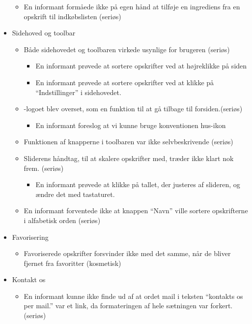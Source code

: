\begin{itemize}[noitemsep]
\begin{itemize}[noitemsep]
  \item En informant formåede ikke på egen hånd at tilføje en ingrediens fra en opskrift til indkøbslisten (seriøs)
  \end{itemize}
 \item Sidehoved og toolbar
  \begin{itemize}[noitemsep]
  \item Både sidehovedet og toolbaren virkede usynlige for brugeren (seriøs)
   \begin{itemize}[noitemsep]
   \item En informant prøvede at sortere opskrifter ved at højreklikke på siden
   \item En informant prøvede at sortere opskrifter ved at klikke på ``Indstillinger'' i sidehovedet.
   \end{itemize}
  \item \Foodl-logoet blev overset, som en funktion til at gå tilbage til forsiden.(seriøs)
   \begin{itemize}[noitemsep]
   \item En informant foreslog at vi kunne bruge konventionen hus-ikon
   \end{itemize}
  \item Funktionen af knapperne i toolbaren var ikke selvbeskrivende (seriøs)
  \item Sliderens håndtag, til at skalere opskrifter med, træder ikke klart nok frem. (seriøs)
   \begin{itemize}[noitemsep]
   \item En informant prøvede at klikke på tallet, der justeres af slideren, og ændre det med tastaturet.
   \end{itemize}
  \item En informant forventede ikke at knappen ``Navn'' ville sortere opskrifterne i alfabetisk orden (seriøs)
  \end{itemize}
 \item Favorisering
  \begin{itemize}[noitemsep]
  \item Favoriserede opskrifter forsvinder ikke med det samme, når de bliver fjernet fra favoritter (kosmetisk)
  \end{itemize}
 \item Kontakt os
  \begin{itemize}[noitemsep]
  \item En informant kunne ikke finde ud af at ordet mail i teksten ``kontakts os per mail.'' var et link, da formateringen af hele sætningen var forkert. (seriøs)
  \end{itemize}
\end{itemize}


